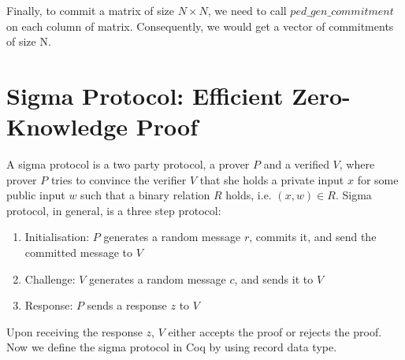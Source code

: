  
Finally, to commit a matrix of size $N \times N$, we need to call 
$ped\_gen\_commitment$ on each column of matrix. Consequently, 
we  would get a vector of commitments of size N.

\section{Sigma Protocol: Efficient Zero-Knowledge Proof}
\label{sec:sigma_coq}
A sigma protocol is a two party protocol, a prover $P$ and a verified $V$, where prover $P$ tries to convince the verifier $V$ that she 
holds a private input $x$ for some public input $w$ such that a binary relation $R$ holds, i.e. $(x, w) \in R$.  Sigma protocol, 
in general, is a three step protocol:
\begin{enumerate}
\item Initialisation: $P$ generates a random message $r$, commits it, and send the committed message to $V$
\item Challenge: $V$ generates a random message $c$, and sends it to $V$
\item Response: $P$ sends a response $z$ to $V$
\end{enumerate} 

\noindent
Upon receiving the response $z$, $V$ either accepts the proof or rejects the proof.  Now we define the sigma protocol in 
Coq by using record data type.


